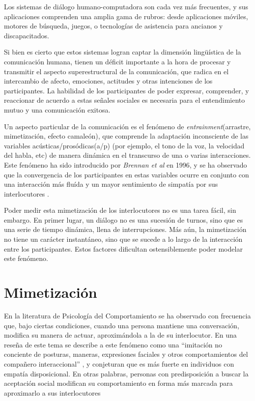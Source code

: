
Los sistemas de diálogo humano-computadora son cada vez más frecuentes, y sus aplicaciones comprenden una amplia gama de rubros: desde aplicaciones móviles, motores de búsqueda, juegos, o tecnologías de asistencia para ancianos y discapacitados.

Si bien es cierto que estos sistemas logran captar la dimensión lingüística de la comunicación humana, tienen un déficit importante a la hora de procesar y transmitir el aspecto superestructural de la comunicación, que radica en el intercambio de afecto, emociones, actitudes y otras intenciones de los participantes. La habilidad de los participantes de poder expresar, comprender, y reaccionar de acuerdo a estas señales sociales es necesaria para el entendimiento mutuo y una comunicación exitosa.

Un aspecto particular de la comunicación es el fenómeno de \emph{entrainment}(arrastre, mimetización, efecto camaleón), que comprende la adaptación inconsciente de las variables acústicas/prosódicas(a/p) (por ejemplo, el tono de la voz, la velocidad del habla, etc) de manera dinámica en el transcurso de una o varias interacciones. Este fenómeno ha sido introducido por \emph{Brennan et al}\cite{BRE1996} en 1996, y se ha observado que la convergencia de los participantes en estas variables ocurre en conjunto con una interacción más fluída y un mayor sentimiento de simpatía por sus interlocutores \cite{CHAR1999}.

Poder medir esta mimetización de los interlocutores no es una tarea fácil, sin embargo. En primer lugar, un diálogo no es una sucesión de turnos, sino que es una serie de tiempo dinámica, llena de interrupciones. Más aún, la mimetización no tiene un carácter instantáneo, sino que se sucede a lo largo de la interacción entre los participantes. Estos factores dificultan ostensiblemente poder modelar este fenómeno.

\section*{Mimetización}

En la literatura de Psicología del Comportamiento se ha observado con frecuencia que, bajo ciertas condiciones, cuando una persona mantiene una conversación, modifica su manera de actuar, aproximándola a la de su interlocutor. En una reseña de este tema se describe a este fenómeno como una ``imitación no conciente de posturas, maneras, expresiones faciales y otros comportamientos del compañero interaccional'' \cite[p. 893]{CHAR1999} , y conjeturan que es más fuerte en individuos con empatía disposicional. En otras palabras, personas con predisposición a buscar la
aceptación social modifican su comportamiento en forma más marcada para aproximarlo a sus interlocutores


